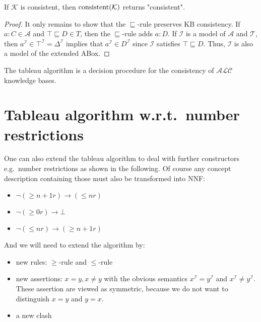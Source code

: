 \begin{lemma}[Completeness]
	If $ \mathcal{K}$ is consistent, then $\operatorname{\text{consistent}}(\mathcal{K})$ returns "consistent".
\end{lemma}
\begin{proof}
	It only remains to show that the $\sqsubseteq$-rule preserves KB consistency.
	If $a :C \in \mathcal{A}$ and $\top \sqsubseteq D \in T$,
	then the $\sqsubseteq$-rule adds $a:D$.
	If $\mathcal{I}$ is a model of $\mathcal{A}$ and $\mathcal{T}$, then
	$a^\mathcal{I} \in \top^\mathcal{I}=\Delta^\mathcal{I}$ implies that $a^\mathcal{I} \in D^\mathcal{I}$ 
	since $\mathcal{I}$ satisfies $\top \sqsubseteq D$.
	Thus, $\mathcal{I}$ is also a model of the extended ABox.
\end{proof}

\begin{theorem}
	The tableau algorithm is a decision procedure for the consistency of $\mathcal{ALC}$ knowledge bases.
\end{theorem}

\newpage
\section{Tableau algorithm w.r.t.\ number restrictions}
One can also extend the tableau algorithm to deal with further constructors e.g.\ number restrictions as shown in the following.
Of course any concept description containing those must also be transformed into NNF:
\begin{itemize}
	\item $\neg \left( \geq n+1 r \right) \to ( \leq n r)$ 
	\item $\neg \left( \geq 0 r \right) \to \bot$
	\item $\neg \left( \leq n r \right) \to \left( \geq n + 1 r \right)$
\end{itemize}
And we will need to extend the algorithm by:
\begin{itemize}
	\item new rules: $ \geq$-rule and $ \leq$-rule
	\item new assertions: $x=y, x \neq y$ with the obvious semantics $x^\mathcal{I} = y^\mathcal{I}$ and $x^\mathcal{I} \neq y^\mathcal{I}$.
		These assertion are viewed as symmetric, because we do not want to distinguish $x = y$ and $y = x$.
	 \item a new clash
\end{itemize}

